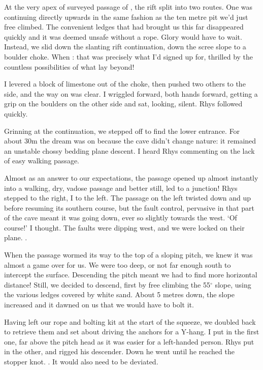 At the very apex of surveyed passage of , the rift split into two routes. One was continuing directly upwards in the same fashion as the ten metre pit we'd just free climbed. The convenient ledges that had brought us this far disappeared quickly and it was deemed unsafe without a rope. Glory would have to wait. Instead, we slid down the slanting rift continuation, down the scree slope to a boulder choke. When : that was precisely what I'd signed up for, thrilled by the countless possibilities of what lay beyond!

I levered a block of limestone out of the choke, then pushed two others to the side, and the way on was clear. I wriggled forward, both hands forward, getting a grip on the boulders on the other side and sat, looking, silent. Rhys followed quickly.

Grinning at the continuation, we stepped off to find the lower entrance. For about 30m the dream was on because the cave didn't change nature: it remained an unstable chossy bedding plane descent. I heard Rhys commenting on the lack of easy walking passage.

Almost as an answer to our expectations, the passage opened up almost instantly into a walking, dry, vadose passage and better still, led to a junction! Rhys stepped to the right, I to the left. The passage on the left twisted down and up before resuming its southern course, but the fault control, pervasive in that part of the cave meant it was going down, ever so slightly towards the west. `Of course!' I thought. The faults were dipping west, and we were locked on their plane. .

When the passage wormed its way to the top of a sloping pitch, we knew it was almost a game over for us. We were too deep, or not far enough south to intercept the surface. Descending the pitch meant we had to find more horizontal distance! Still, we decided to descend, first by free climbing the 55$^{\circ}$  slope, using the various ledges covered by white sand. About 5 metres down, the slope increased and it dawned on us that we would have to bolt it.

Having left our rope and bolting kit at the start of the squeeze, we doubled back to retrieve them and set about driving the anchors for a Y-hang. I put in the first one, far above the pitch head as it was easier for a left-handed person. Rhys put in the other, and rigged his descender. Down he went until he reached the stopper knot. . It would also need to be deviated.

